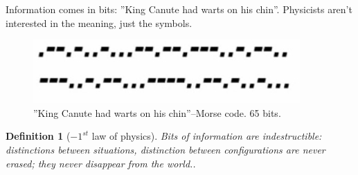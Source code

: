 \documentclass[]{article}
\newtheorem{defn}[thm]{Definition}
\begin{document}
Information comes in bits: ''King Canute had warts on his chin''. Physicists aren't interested in the meaning, just the symbols.

\begin{figure}[H]
	\caption{''King Canute had warts on his chin''--Morse code. 65 bits.}
	\includegraphics{wh-kcwc}
\end{figure}

\begin{defn}[$-1^{st}$ law of physics]
	Bits of information are indestructible: distinctions between situations, distinction between configurations are never erased; they never disappear from the world..
\end{defn}
\end{document}
